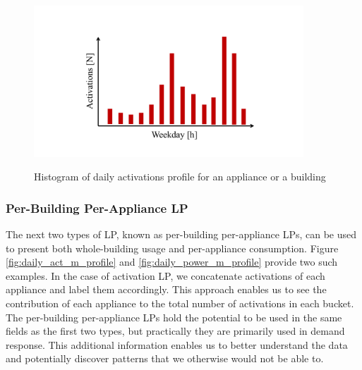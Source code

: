 \begin{figure}[H]
	\centering
	\caption{Histogram of daily activations profile for an appliance or a building}
	\includegraphics[width=0.9\textwidth]{Figures/profile_sketches/slide5.pdf}
	\label{fig:daily_act_profile}
\end{figure}

\subsubsection{Per-Building Per-Appliance LP}
The next two types of LP, known as per-building per-appliance LPs, can be used to present both whole-building usage and per-appliance consumption.
Figure \ref{fig:daily_act_m_profile} and \ref{fig:daily_power_m_profile} provide two such examples.
In the case of activation LP, we concatenate activations of each appliance and label them accordingly.
This approach enables us to see the contribution of each appliance to the total number of activations in each bucket.
The per-building per-appliance LPs hold the potential to be used in the same fields as the first two types, but practically they are primarily used in demand response.
This additional information enables us to better understand the data and potentially discover patterns that we otherwise would not be able to.

